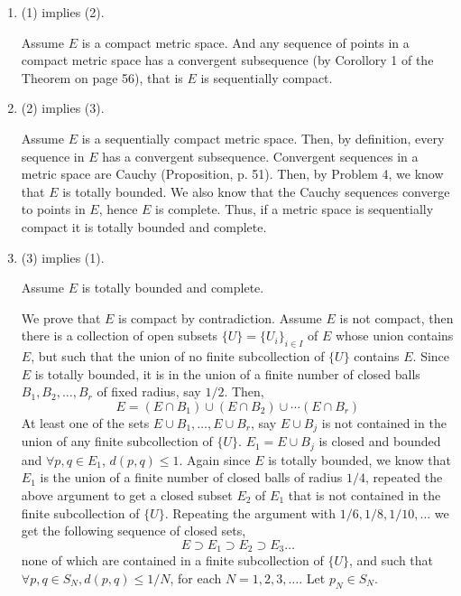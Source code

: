 \documentclass[12pt]{article}
\begin{document}
\begin{solution}
    \bbni

    \begin{enumerate}
        \item (1) implies (2). 
        
        Assume $E$ is a compact metric space. And any sequence of points in a compact metric space has a convergent subsequence (by Corollory 1 of the Theorem on page 56), that is $E$ is sequentially compact. 

        \item (2) implies (3). 
        
        Assume $E$ is a sequentially compact metric space. Then, by definition, every sequence in $E$ has a convergent subsequence. Convergent sequences in a metric space are Cauchy (Proposition, p. 51). Then, by Problem 4, we know that $E$ is totally bounded. We also know that the Cauchy sequences converge to points in $E$, hence $E$ is complete. Thus, if a metric space is sequentially compact it is totally bounded and complete. 

        \item (3) implies (1).

        Assume $E$ is totally bounded and complete. 

        We prove that $E$ is compact by contradiction. Assume $E$ is not compact, then there is a collection of open subsets $\{U\} = \{U_i\}_{i \in I}$ of $E$ whose union contains $E$, but such that the union of no finite subcollection of $\{U\}$ contains $E$. Since $E$ is totally bounded, it is in the union of a finite number of closed balls $B_1, B_2, \ldots, B_r$ of fixed radius, say $1/2$. Then, 
        \[E = (E \cap B_1) \cup (E \cap B_2) \cup \cdots (E \cap B_r)\]
        At least one of the sets $E \cup B_1, \ldots, E \cup B_r$, say $E \cup B_j$ is not contained in the union of any finite subcollection of $\{U\}$. $E_1 = E \cup B_j$ is closed and bounded and $\forall p, q \in E_1$, $d(p, q) \leq 1$. Again since $E$ is totally bounded, we know that $E_1$ is the union of a finite number of closed balls of radius $1/4$, repeated the above argument to get a closed subset $E_2$ of $E_1$ that is not contained in the finite subcollection of $\{U\}$. Repeating the argument with $1/6, 1/8, 1/10, \ldots$ we get the following sequence of closed sets, 
        \[E \supset E_1 \supset E_2 \supset E_3 \ldots\]
        none of which are contained in a finite subcollection of $\{U\}$, and such that $\forall p, q \in S_N, d(p, q) \leq 1/N$, for each $N = 1, 2, 3, \ldots$. Let $p_N \in S_N$. 


\end{enumerate}
\end{solution}
\end{document}
